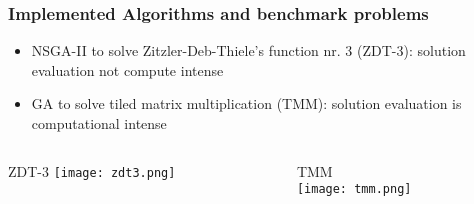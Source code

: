\begin{frame}
  \frametitle{Implemented Algorithms and benchmark problems} 
  \begin{itemize}
    \item NSGA-II to solve Zitzler-Deb-Thiele's function nr. 3 (ZDT-3): solution evaluation not compute intense
    \item GA to solve tiled matrix multiplication (TMM): solution evaluation is computational intense
  \end{itemize}
  \scriptsize
  \begin{columns}
    \begin{column}{.5\textwidth}
      \begin{center}
	ZDT-3
	\texttt{[image: zdt3.png]}
      \end{center}
    \end{column}
    \begin{column}{.5\textwidth}
      \begin{center}
	TMM\\
	\vspace{.5em}
	\texttt{[image: tmm.png]}
      \end{center}
    \end{column}
  \end{columns}
\end{frame}

